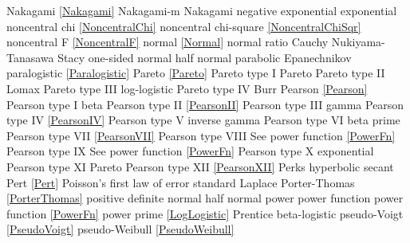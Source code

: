 Nakagami 						\dotfill	\eqref{Nakagami} 					\ncite	%
Nakagami-m 						\dotfill	Nakagami 						\ncite   	%
negative exponential			\dotfill	exponential 						\ncite	%
noncentral chi					\dotfill	\eqref{NoncentralChi}				\ncite
noncentral chi-square			\dotfill	\eqref{NoncentralChiSqr}			\ncite
noncentral F					\dotfill	\eqref{NoncentralF}				\ncite	%
normal 							\dotfill	\eqref{Normal}						\ncite	%
normal ratio  					\dotfill	Cauchy 							\ncite	%
Nukiyama-Tanasawa 				\dotfill	Stacy 							   	%
%
one-sided normal  				\dotfill	half normal						\ncite	%
parabolic						\dotfill	Epanechnikov						\ncite
paralogistic					\dotfill	\eqref{Paralogistic} 					\ncite	%
Pareto							\dotfill	\eqref{Pareto}						\ncite	%
Pareto type I					\dotfill	Pareto							\ncite	%
Pareto type II					\dotfill	Lomax 							\ncite	%
Pareto type III					\dotfill	log-logistic						\ncite	%
Pareto type IV					\dotfill	Burr								\ncite	%
Pearson			 				\dotfill	\eqref{Pearson}						\ncite	%
Pearson type I					\dotfill	beta 								\ncite	%
Pearson type II					\dotfill	\eqref{PearsonII}					\ncite	%
Pearson type III   				\dotfill	gamma 								\ncite	%
Pearson type IV   				\dotfill	\eqref{PearsonIV} 					\ncite	%
Pearson type V    				\dotfill	inverse gamma						\ncite	%
Pearson type VI					\dotfill	beta prime 							\ncite	%
Pearson type VII				\dotfill	\eqref{PearsonVII} 					\ncite	%
Pearson type VIII				\dotfill	See power function \eqref{PowerFn}	\ncite	%
Pearson type IX					\dotfill	See power function \eqref{PowerFn}	\ncite	%
Pearson type X    				\dotfill	exponential							\ncite	%
Pearson type XI    				\dotfill	Pareto								
Pearson type XII 				\dotfill	\eqref{PearsonXII}					\ncite	%
Perks							\dotfill	hyperbolic secant 					\ncite	%
Pert							\dotfill	\eqref{Pert} 						\ncite	%
Poisson's first law of error	\dotfill	standard Laplace					\ncite	%
Porter-Thomas					\dotfill	\eqref{PorterThomas}				\ncite
positive definite normal 		\dotfill	half normal 						\ncite 	%
power							\dotfill	power function 						\ncite	%
power function					\dotfill	\eqref{PowerFn}						\ncite	%
power prime						\dotfill	\eqref{LogLogistic}					\mcite{\self}
Prentice 						\dotfill	beta-logistic							
pseudo-Voigt					\dotfill	\eqref{PseudoVoigt}					\ncite
pseudo-Weibull					\dotfill	\eqref{PseudoWeibull}				\ncite	%
